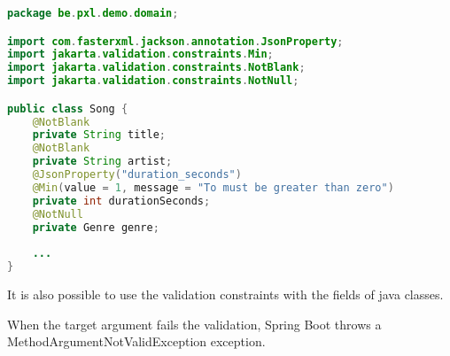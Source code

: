 \begin{lstlisting}[language=java, frame=single]
package be.pxl.demo.domain;

import com.fasterxml.jackson.annotation.JsonProperty;
import jakarta.validation.constraints.Min;
import jakarta.validation.constraints.NotBlank;
import jakarta.validation.constraints.NotNull;

public class Song {
	@NotBlank
	private String title;
	@NotBlank
	private String artist;
	@JsonProperty("duration_seconds")
	@Min(value = 1, message = "To must be greater than zero")
	private int durationSeconds;
	@NotNull
	private Genre genre;
	
	...
}
\end{lstlisting}

It is also possible to use the validation constraints with the fields of java classes.

When the target argument fails the validation, Spring Boot throws a MethodArgumentNotValidException exception.